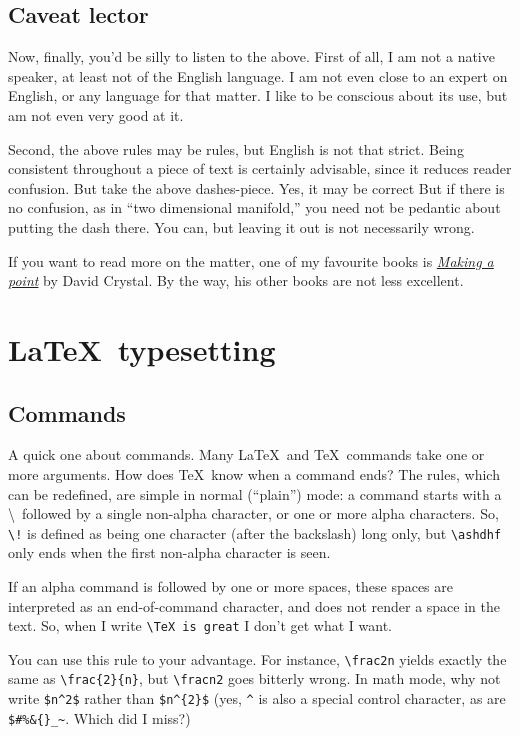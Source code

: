 \documentclass{article}
\begin{document}
\subsection{Caveat lector}

Now, finally, you'd be silly to listen to the above.
First of all, I am not a native speaker, at least not of the English language.  
I am not even close to an expert on English, or any language for that matter.
I like to be conscious about its use, but am not even very good at it.

Second, the above rules may be rules, but English is not that strict.
Being consistent throughout a piece of text is certainly advisable, since it reduces reader confusion.
But take the above dashes-piece.
Yes, it may be correct
 But if there is no confusion, as in ``two dimensional manifold,'' you need not be pedantic about putting the dash there.
 You can, but leaving it out is not necessarily wrong.

If you want to read more on the matter, one of my favourite books is \href{https://profilebooks.com/making-a-point.html}{\textsl{Making a point}} by David Crystal. 
By the way, his other books are not less excellent.


\section{\LaTeX\ typesetting}
\subsection{Commands}
A quick one about commands.  Many \LaTeX\ and \TeX\ commands take one or more 
arguments. How does \TeX\ know when a command ends? The rules, which can be
redefined, are simple in normal (``plain'') mode:
	a command starts with a \textbackslash\ followed by a single
  	non-alpha character, or one or more alpha characters.  So,
	\verb+\!+ is defined as being one character (after the backslash)
	long only, but \verb+\ashdhf+ only ends when the first non-alpha
	character is seen.

If an alpha command is followed by one or more spaces, these spaces are interpreted as an end-of-command character, and does not render a space in the text.  So, when I write \verb+\TeX is great+ I don't get what I want.

You can use this rule to your advantage.  For instance, \verb+\frac2n+ yields exactly the same as \verb+\frac{2}{n}+, but \verb+\fracn2+ goes bitterly wrong.  In math mode, why not write \verb+$n^2$+ rather than \verb+$n^{2}$+ (yes, \verb+^+ is also a special control character, as are \verb+$#%&{}_~+.  Which did I miss?)
 
\end{document}
